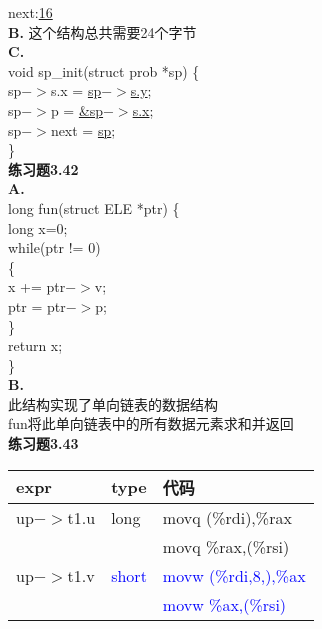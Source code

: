 \documentclass{article}
\newcommand{\blue}[1]{\textcolor{blue}{#1}}
\begin{document}
\begin{CJK}{UTF8}{uyhei}
next:\underline{16}	\\[1ex]
\textbf{B.} 这个结构总共需要24个字节	\\[1ex]
\textbf{C.}  	\\
void sp\_init(struct prob *sp) \{	\\
	\hspace*{2em}sp$->$s.x = \underline{sp$->$s.y};	\\
	\hspace*{2em}sp$->$p = \underline{\&sp$->$s.x};	\\
	\hspace*{2em}sp$->$next = \underline{sp};	\\
\}	\\[3ex]
\textbf{练习题3.42}	\\
\textbf{A.} 	\\
long fun(struct ELE *ptr) \{	\\
	\hspace*{2em}long x=0;	\\
	\hspace*{2em}while(ptr != 0)	\\
	\hspace*{2em}\{	\\
		\hspace*{4em}x += ptr$->$v;	\\
		\hspace*{4em}ptr = ptr$->$p;	\\
	\hspace*{2em}\}	\\
	\hspace*{2em}return x;	\\
\}	\\[2ex]
\textbf{B.}	\\
此结构实现了单向链表的数据结构	\\
fun将此单向链表中的所有数据元素求和并返回	\\[3ex]
\newpage
\textbf{练习题3.43}	\\
\renewcommand\arraystretch{1.4}
\begin{table}[htbp]
\centering
\begin{tabular}{|m{12em}<{\centering}|m{8em}<{\centering}|m{18em}<{\centering}|}
\hline
expr		&	type	&	代码	\\
\hline
up$->$t1.u	&	long	&	movq (\%rdi),\%rax	\\
		&		&	movq \%rax,(\%rsi)	\\
\hline
up$->$t1.v	&	\blue{short}	&	\blue{movw (\%rdi,8,),\%ax}	\\
		&			&	\blue{movw \%ax,(\%rsi)}	\\

\end{tabular}
\end{table}
\end{CJK}
\end{document}
